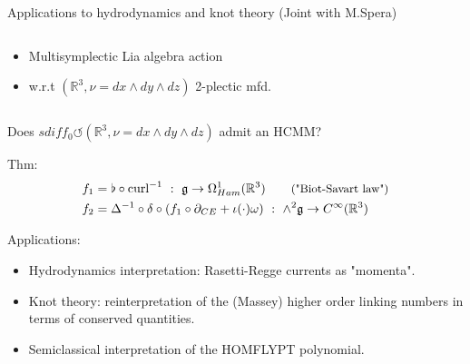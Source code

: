 \documentclass[handout,10pt]{beamer}
\begin{document}
\begin{frame}{Applications to hydrodynamics and knot theory (Joint with M.Spera)}
\begin{columns}
\begin{column}{.7\linewidth}
\begin{itemize}
				\item Multisymplectic Lia algebra action
				\item[] w.r.t $(\mathbb{R}^3,\nu = dx\wedge dy\wedge dz)$ 2-plectic mfd.
			\end{itemize}
		\end{column}
	\end{columns}
	\pause
	\vfill
	\begin{center}
		\alert{
		\faQuestionCircle \qquad
			{Does $sdiff_0 \circlearrowleft (\mathbb{R}^3,\nu = dx\wedge dy\wedge dz)$ admit an HCMM?}	
		\qquad \faQuestionCircle		
		}
	\end{center}
	\pause
{}
\begin{tcolorbox}[sidebyside,righthand width=.75\linewidth]
	Thm: \cite{Miti2018}
	\tcblower
	\vspace{-1.5em}
	\begin{align*}
	f_1 &= \flat \circ \text{curl}^{-1} ~:~ \mathfrak{g} \to \Omega^{1}_{Ham}(\mathbb{R}^3)
	\qquad \text{\small ("Biot-Savart law")}
	\\
	f_2 &= \Delta^{-1} \circ \delta \circ (f_1 \circ \partial_{CE} +\iota(\cdot)\omega) ~:~ \wedge^2\mathfrak{g} \to C^{\infty}(\mathbb{R}^3)
	\end{align*}
\end{tcolorbox}
	
	
	

	\pause
	\vfill
	Applications:
	\begin{itemize}[<+->]%
		\item[\CheckedBox]  Hydrodynamics interpretation: Rasetti-Regge currents as "momenta".
		\item[\CheckedBox]  Knot theory: reinterpretation of the (Massey) higher order linking numbers in terms of conserved quantities.
		\item[\CheckedBox]  Semiclassical interpretation of the HOMFLYPT polynomial.
	\end{itemize}

\end{frame}
\end{document}

